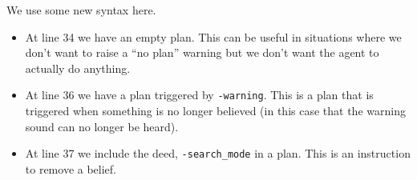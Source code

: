 We use some new syntax here.  
\begin{itemize}
\item At line 34 we have an empty plan.  This can be useful in situations where we don't want to raise a ``no plan'' warning but we don't want the agent to actually do anything.
\item At line 36 we have a plan triggered by \lstinline{-warning}.  This is a plan that is triggered when something is no longer believed (in this case that the warning sound can no longer be heard).
\item At line 37 we include the deed, \lstinline{-search_mode} in a plan.  This is an instruction to remove a belief.
\end{itemize}

